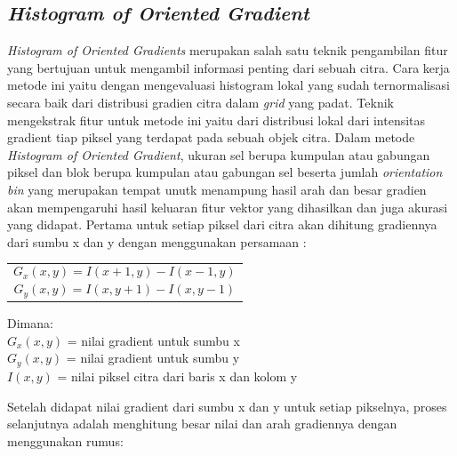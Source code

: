\subsection{\textit{Histogram of Oriented Gradient}}
\noindent\textit{Histogram of Oriented Gradients} merupakan salah satu teknik pengambilan fitur yang bertujuan untuk mengambil informasi penting dari sebuah citra. Cara kerja metode ini yaitu dengan mengevaluasi histogram lokal yang sudah ternormalisasi secara baik dari distribusi gradien citra dalam \textit{grid} yang padat. Teknik mengekstrak fitur untuk metode ini yaitu dari distribusi lokal dari intensitas gradient tiap piksel yang terdapat pada sebuah objek citra. Dalam metode \textit{Histogram of Oriented Gradient}, ukuran sel berupa kumpulan atau gabungan piksel dan blok berupa kumpulan atau gabungan sel beserta jumlah \textit{orientation bin} yang merupakan tempat unutk menampung hasil arah dan besar gradien akan mempengaruhi hasil keluaran fitur vektor yang dihasilkan dan juga akurasi yang didapat. Pertama untuk setiap piksel dari citra akan dihitung gradiennya dari sumbu x dan y dengan menggunakan persamaan :

\begin{table}[H]
	\small
	\begin{adjustbox}{width=1\textwidth}
		\begin{tabular}{|p{13.55cm}|}
			\hline
			\begin{equation} 
			G_{x}(x, y) = I(x+1, y) - I(x-1, y)
			\label{eq:PersamaanGradienX}
			\end{equation}\\
			\begin{equation} 
			G_{y}(x, y) = I(x, y+1) - I(x, y-1)
			\label{eq:PersamaanGradienY}
			\end{equation}\\
			\hline
		\end{tabular}
	\end{adjustbox}
\end{table}

\noindent Dimana:\\
$G_{x}(x,y)$ = nilai gradient untuk sumbu x\\
$G_{y}(x,y)$ = nilai gradient untuk sumbu y\\
$I(x,y)$ = nilai piksel citra dari baris x dan kolom y

\noindent Setelah didapat nilai gradient dari sumbu x dan y untuk setiap pikselnya, proses selanjutnya adalah menghitung besar nilai dan arah gradiennya dengan menggunakan rumus:

